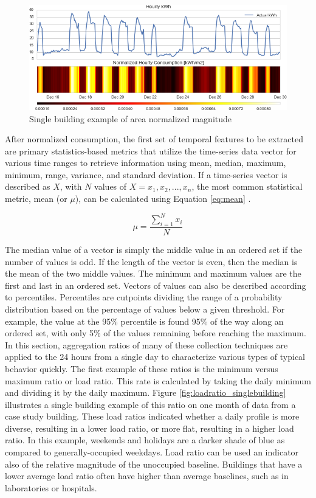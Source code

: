\begin{figure}[ht!]
\begin{center}
\includegraphics[width=1\columnwidth]{figures/normalizedcons_example/normalizedcons_example}
\caption{Single building example of area normalized magnitude
\label{fig:normalizedmag}%
}
\end{center}
\end{figure}

After normalized consumption, the first set of temporal features to be extracted are primary statistics-based metrics that utilize the time-series data vector for various time ranges to retrieve information using mean, median, maximum, minimum, range, variance, and standard deviation. If a time-series vector is described as $X$, with $N$ values of $X = {x_1, x_2,...,x_n}$, the most common statistical metric, mean (or $\mu$), can be calculated using Equation \ref{eq:mean} \citep{Mitsa_2010}.

\begin{equation}
\mu = \frac{\sum\limits_{i=1}^N x_i}{N}
\label{eq:mean}
\end{equation}

The median value of a vector is simply the middle value in an ordered set if the number of values is odd. If the length of the vector is even, then the median is the mean of the two middle values. The minimum and maximum values are the first and last in an ordered set. Vectors of values can also be described according to percentiles. Percentiles are cutpoints dividing the range of a probability distribution based on the percentage of values below a given threshold. For example, the value at the 95\% percentile is found 95\% of the way along an ordered set, with only 5\% of the values remaining before reaching the maximum. In this section, aggregation ratios of many of these collection techniques are applied to the 24 hours from a single day to characterize various types of typical behavior quickly. The first example of these ratios is the minimum versus maximum ratio or load ratio. This rate is calculated by taking the daily minimum and dividing it by the daily maximum. Figure \ref{fig:loadratio_singlebuilding} illustrates a single building example of this ratio on one month of data from a case study building. These load ratios indicated whether a daily profile is more diverse, resulting in a lower load ratio, or more flat, resulting in a higher load ratio. In this example, weekends and holidays are a darker shade of blue as compared to generally-occupied weekdays. Load ratio can be used an indicator also of the relative magnitude of the unoccupied baseline. Buildings that have a lower average load ratio often have higher than average baselines, such as in laboratories or hospitals.

